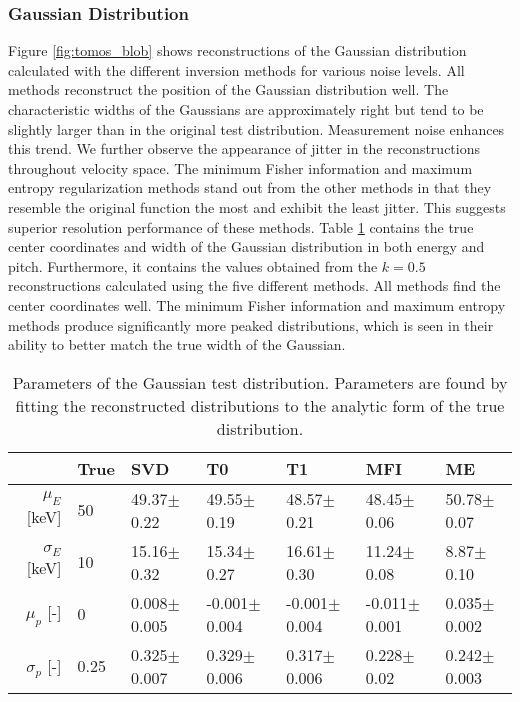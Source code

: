\subsubsection{Gaussian Distribution}
Figure \ref{fig:tomos_blob} shows reconstructions of the Gaussian distribution calculated with the different inversion methods for various noise levels. 
All methods reconstruct the position of the Gaussian distribution well. The characteristic widths of the Gaussians are approximately right but tend to be slightly larger than in the original test distribution. Measurement noise enhances this trend. We further observe the appearance of jitter in the reconstructions throughout velocity space. 
The minimum Fisher information and maximum entropy regularization methods stand out from the other methods in that they resemble the original function the most and exhibit the least jitter. This suggests superior resolution performance of these methods. Table \ref{tab:synthetic_parameters_blob} contains the true center coordinates and width of the Gaussian distribution in both energy and pitch. Furthermore, it contains the values obtained from the $k=0.5$ reconstructions calculated using the five different methods. All methods find the center coordinates well. The minimum Fisher information and maximum entropy methods produce significantly more peaked distributions, which is seen in their ability to better match the true width of the Gaussian. 
\begin{table}[h!]
    \caption{\label{tab:synthetic_parameters_blob} Parameters of the Gaussian test distribution. Parameters are found by fitting the reconstructed distributions to the analytic form of the true distribution.}
    \begin{tabular}{@{}r|llllll}
     & \textbf{True} & \textbf{SVD} & \textbf{T0} & \textbf{T1} & \textbf{MFI} & \textbf{ME} \\
    \hline\hline
    $\mu_E$ [keV] & 50 & 49.37$\pm$0.22 & 49.55$\pm$0.19 & 48.57$\pm$0.21 &  48.45$\pm$0.06 & 50.78$\pm$0.07 \\
    $\sigma_E$ [keV] & 10 & 15.16$\pm$0.32 & 15.34$\pm$0.27 & 16.61$\pm$0.30 & 11.24$\pm$0.08 & 8.87$\pm$0.10 \\
    $\mu_p$ [-] & 0 & 0.008$\pm$0.005 & -0.001$\pm$0.004 & -0.001$\pm$0.004 & -0.011$\pm$0.001 & 0.035$\pm$0.002 \\
    $\sigma_p$ [-] & 0.25 & 0.325$\pm$0.007 & 0.329$\pm$0.006 & 0.317$\pm$0.006 & 0.228$\pm$0.02 & 0.242$\pm$0.003 \\
    \hline
    \end{tabular}
\end{table}


